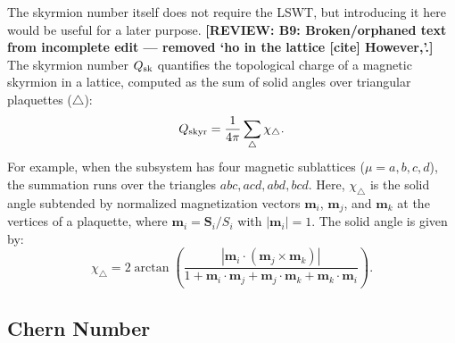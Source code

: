 \documentclass[aps, prx, nofootinbib, superscriptaddress]{revtex4-2}
\newcommand{\REVIEW}[1]{{\color{reviewcolor}\bfseries [REVIEW: #1]}}
\begin{document}
The skyrmion number itself does not require the LSWT, but introducing it here would be useful for a later purpose.
\REVIEW{B9: Broken/orphaned text from incomplete edit --- removed `ho in the lattice [cite] However,'.}
The skyrmion number $Q_{\rm sk}$ quantifies the topological charge of a magnetic skyrmion in a lattice, computed as the sum of solid angles over triangular plaquettes ($\triangle$):
\begin{equation}
    Q_{\rm skyr} 
    = \frac{1}{4\pi} \sum_{\triangle} \chi_{\triangle}.
\end{equation}
For example, when the subsystem has four magnetic sublattices ($\mu = a, b, c, d$), the summation runs over the triangles $abc, acd, abd, bcd$.
Here, $\chi_{\triangle}$ is the solid angle subtended by normalized magnetization vectors $\mathbf{m}_i$, $\mathbf{m}_j$, and $\mathbf{m}_k$ at the vertices of a plaquette, where $\mathbf{m}_i = \mathbf{S}_i / S_i$ with $|\mathbf{m}_i| = 1$. The solid angle is given by:
\begin{equation}
    \chi_{\triangle} 
    = 2 \arctan 
    \left( 
    \frac{|\mathbf{m}_i \cdot (\mathbf{m}_j \times \mathbf{m}_k)|}{1 + \mathbf{m}_i \cdot \mathbf{m}_j + \mathbf{m}_j \cdot \mathbf{m}_k + \mathbf{m}_k \cdot \mathbf{m}_i} 
    \right).
\end{equation}





\subsection{Chern Number}\label{subsec: Chern number}
\end{document}
